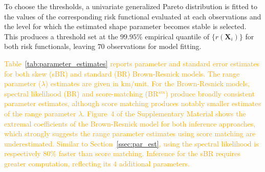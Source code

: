 \documentclass[12pt]{article}
\newcommand{\PZ}{\textcolor{orange}}
\begin{document}
%
To choose the thresholds, a univariate generalized Pareto distribution is fitted to the values of the corresponding risk functional evaluated at each observations and the level for which the estimated shape parameter becomes stable is selected. 
%
This produces a threshold set at the $99.95\%$ empirical quantile of $\{r(\bm X_i)\}$
for both 
risk functionals, leaving $70$ 
observations for model fitting. 
%
% 

\PZ{Table~\ref{tab:parameter_estimates} reports parameter and standard error estimates for both skew (sBR) and standard (BR) Brown-Resnick models. The range parameter ($\lambda$) estimates are given in km/unit. For the Brown-Resnick models, spectral likelihood (BR) and score-matching (BR$^{sm}$) produce broadly consistent parameter estimates, although score matching produces notably smaller estimates of the range parameter $\lambda$. Figure~4 of the Supplementary Material shows the extremal coefficients of the Brown-Resnick model for both inference approaches, which strongly suggests the range parameter estimates using score matching are underestimated. Similar to Section~\ref{ssec:par_est}, using the spectral likelihood is respectively $80\%$ faster than score matching. 
%
Inference for the sBR requires greater computation, reflecting its $4$ additional parameters. 
}
\end{document}
